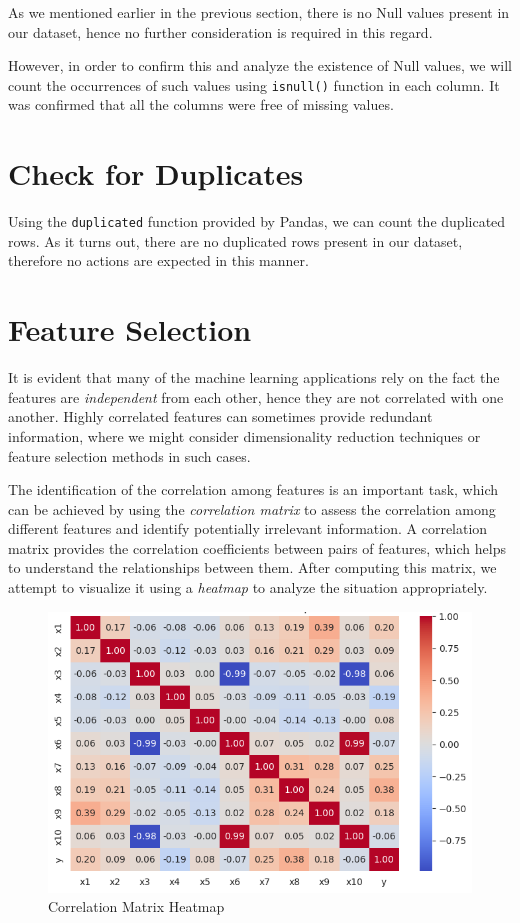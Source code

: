 As we mentioned earlier in the previous section, there is no Null values present in our dataset, hence no further consideration is required in this regard.

However, in order to confirm this and analyze the existence of Null values, we will count the occurrences of such values using \texttt{isnull()} function in each column. It was confirmed that all the columns were free of missing values.

\section{Check for Duplicates}

Using the \texttt{duplicated} function provided by Pandas, we can count the duplicated rows. As it turns out, there are no duplicated rows present in our dataset, therefore no actions are expected in this manner.

\section{Feature Selection}

It is evident that many of the machine learning applications rely on the fact the features are \textit{independent} from each other, hence they are not correlated with one another. Highly correlated features can sometimes provide redundant information, where we might consider dimensionality reduction techniques or feature selection methods in such cases.

The identification of the correlation among features is an important task, which can be achieved by using the \textit{correlation matrix} to assess the correlation among different features and identify potentially irrelevant information. A correlation matrix provides the correlation coefficients between pairs of features, which helps to understand the relationships between them. After computing this matrix, we attempt to visualize it using a \textit{heatmap} to analyze the situation appropriately.

\begin{figure}[h]
    \centering
    \includegraphics[width=0.8\linewidth]{images/correlation.png}
    \caption{Correlation Matrix Heatmap}
    \label{fig:correlation}
\end{figure}

